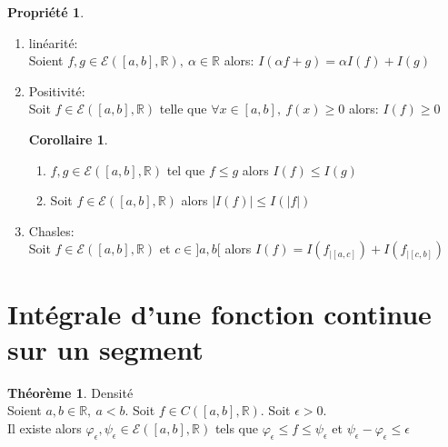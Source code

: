 \documentclass[fleqn]{article}
\theoremstyle{definition} \newtheorem*{defi}{D\'efinition}
\theoremstyle{definition} \newtheorem*{theo}{Th\'eor\`eme}
\theoremstyle{definition} \newtheorem*{coro}{Corollaire}
\theoremstyle{remark} \newtheorem*{rqs}{Remarques}
\theoremstyle{definition} \newtheorem*{prop}{Propri\'et\'e}
\begin{document}
\begin{prop} $ $
	\begin{enumerate}
		\item lin\'earit\'e: \\
			Soient $f,g \in \mathcal{E}([a,b], \mathbb{R}),\ \alpha \in \mathbb{R}$ alors: $I(\alpha f + g) = \alpha I(f) + I(g)$
		\item Positivit\'e: \\
			Soit $f \in \mathcal{E}([a,b], \mathbb{R})$ telle que $\forall x \in [a,b],\ f(x) \geq 0$ alors: $I(f) \geq 0$
			\begin{coro} $ $
				\begin{enumerate}
					\item $f,g \in \mathcal{E}([a,b], \mathbb{R})$ tel que $f \leq g$ alors $I(f) \leq I(g)$
					\item Soit $f \in \mathcal{E}([a,b], \mathbb{R})$ alors $|I(f)| \leq I(|f|)$
				\end{enumerate}
			\end{coro}
		\item Chasles: \\
			Soit $f \in \mathcal{E}([a,b], \mathbb{R})$ et $c \in ]a,b[$ alors $I(f) = I(f_{|[a,c]}) + I(f_{|[c,b]})$
	\end{enumerate}
\end{prop}

\section{Int\'egrale d'une fonction continue sur un segment}
\begin{theo} Densit\'e \\
	Soient $a,b \in \mathbb{R},\ a < b$. Soit $f \in C([a,b], \mathbb{R})$. Soit $\epsilon > 0$. \\
	Il existe alors $\varphi_{\epsilon}, \psi_{\epsilon} \in \mathcal{E}([a,b], \mathbb{R})$ tels que $\varphi_{\epsilon} \leq f
	\leq \psi_{\epsilon}$ et $\psi_{\epsilon} - \varphi_{\epsilon} \leq \epsilon$
\end{theo}
\end{document}
